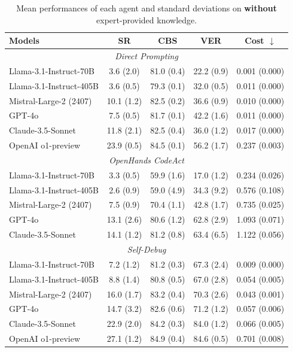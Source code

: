 \begin{table}[h]
\small
\centering
\caption{Mean performances of each agent and standard deviations on \bench \textbf{without} expert-provided knowledge. }
\vspace{-5.5pt}
\begin{tabular}{lcccc}
\toprule
\textbf{Models} & \textbf{SR} & \textbf{CBS} & \textbf{VER} & \textbf{Cost $\downarrow$} \\
\midrule
\multicolumn{5}{c}{\textit{Direct Prompting}} \\
\midrule
Llama-3.1-Instruct-70B & 3.6 (2.0) & 81.0 (0.4) & 22.2 (0.9) & 0.001 (0.000) \\
Llama-3.1-Instruct-405B & 3.6 (0.5) & 79.3 (0.1) & 32.0 (0.5) & 0.011 (0.000) \\
Mistral-Large-2 (2407) & 10.1 (1.2) & 82.5 (0.2) & 36.6 (0.9) & 0.010 (0.000) \\
\midrule
GPT-4o & 7.5 (0.5) & 81.7 (0.1) & 42.2 (1.6) & 0.011 (0.000) \\
Claude-3.5-Sonnet & 11.8 (2.1) & 82.5 (0.4) & 36.0 (1.2) & 0.017 (0.000) \\
\rowcolor{mygray}
OpenAI o1-preview & 23.9 (0.5) & 84.5 (0.1) & 56.2 (1.7) & 0.237 (0.003) \\
\midrule
\multicolumn{5}{c}{\textit{OpenHands CodeAct}} \\
\midrule
Llama-3.1-Instruct-70B & 3.3 (0.5) & 59.9 (1.6) & 17.0 (1.2) & 0.234 (0.026) \\
Llama-3.1-Instruct-405B & 2.6 (0.9) & 59.0 (4.9) & 34.3 (9.2) & 0.576 (0.108) \\
Mistral-Large-2 (2407) & 7.5 (0.9) & 70.4 (1.1) & 42.8 (1.7) & 0.735 (0.025) \\
\midrule
GPT-4o & 13.1 (2.6) & 80.6 (1.2) & 62.8 (2.9) & 1.093 (0.071) \\
Claude-3.5-Sonnet & 14.1 (1.2) & 81.2 (0.8) & 63.4 (6.5) & 1.122 (0.056) \\
\midrule
\multicolumn{5}{c}{\textit{Self-Debug}} \\
\midrule
Llama-3.1-Instruct-70B & 7.2 (1.2) & 81.2 (0.3) & 67.3 (2.4) & 0.009 (0.000) \\
Llama-3.1-Instruct-405B & 8.8 (1.4) & 80.8 (0.5) & 67.0 (2.8) & 0.054 (0.005) \\
Mistral-Large-2 (2407) & 16.0 (1.7) & 83.2 (0.4) & 70.3 (2.6) & 0.043 (0.001) \\
\midrule
GPT-4o & 14.7 (3.2) & 82.6 (0.6) & 71.2 (1.2) & 0.057 (0.006) \\
Claude-3.5-Sonnet & 22.9 (2.0) & 84.2 (0.3) & 84.0 (1.2) & 0.066 (0.005) \\
\rowcolor{mygray}
OpenAI o1-preview & 27.1 (1.2) & 84.9 (0.4) & 84.6 (0.5) & 0.701 (0.008) \\
\bottomrule
\end{tabular}
\label{tab:mean_std_no_know}
\vspace{-11pt}
\end{table}

